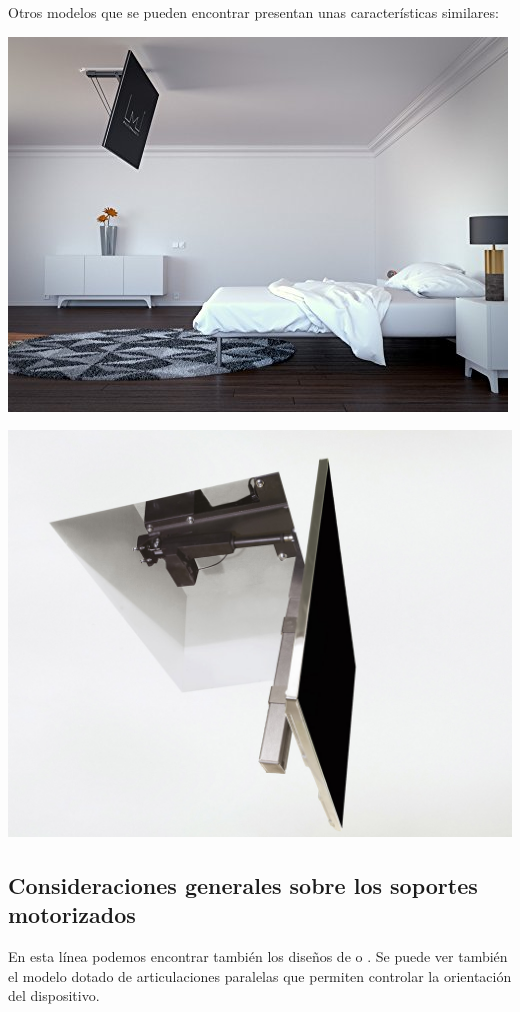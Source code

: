  \vspace{0.1cm}
Otros modelos que se pueden encontrar presentan unas características similares:

\begin{minipage}{0.5\textwidth}
   \includegraphics[width=0.8\linewidth]{figuras/Imagenes_EstadoArte/not_valid_2.jpg}
\end{minipage}
\begin{minipage}{0.5\textwidth}
   \includegraphics[width=0.8\linewidth]{figuras/Imagenes_EstadoArte/not_valid_3.jpg}
\end{minipage}
 \subsection{Consideraciones generales sobre los soportes motorizados}

    En esta línea podemos encontrar también los diseños de \cite{Chung2009} o \cite{ChungL.Chang2008}. Se puede ver también el modelo \cite{Chung2009} dotado de articulaciones paralelas que permiten controlar la orientación del dispositivo.
    \\
    
